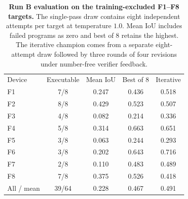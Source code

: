 \begin{table}[t]
\caption{\textbf{Run B evaluation on the training-excluded F1--F8 targets.}
The single-pass draw contains eight independent attempts per target at
temperature $1.0$. Mean IoU includes failed programs as zero and best of 8
retains the highest. The iterative champion comes from a separate
eight-attempt draw followed by three rounds of four revisions under
number-free verifier feedback.}
\label{tab:rl}
\begingroup
\scriptsize
\setlength{\tabcolsep}{3.2pt}
\renewcommand{\arraystretch}{1.06}
\begin{ruledtabular}
\begin{tabular}{@{}lcccc@{}}
Device & Executable & Mean IoU & Best of 8 & Iterative \\
\colrule
F1 & 7/8 & 0.247 & 0.436 & 0.518 \\
F2 & 8/8 & 0.429 & 0.523 & 0.507 \\
F3 & 4/8 & 0.082 & 0.214 & 0.336 \\
F4 & 5/8 & 0.314 & 0.663 & 0.651 \\
F5 & 3/8 & 0.063 & 0.244 & 0.293 \\
F6 & 3/8 & 0.202 & 0.643 & 0.716 \\
F7 & 2/8 & 0.110 & 0.483 & 0.489 \\
F8 & 7/8 & 0.375 & 0.526 & 0.418 \\
\colrule
All / mean & 39/64 & 0.228 & 0.467 & 0.491 \\
\end{tabular}
\end{ruledtabular}
\endgroup
\end{table}
